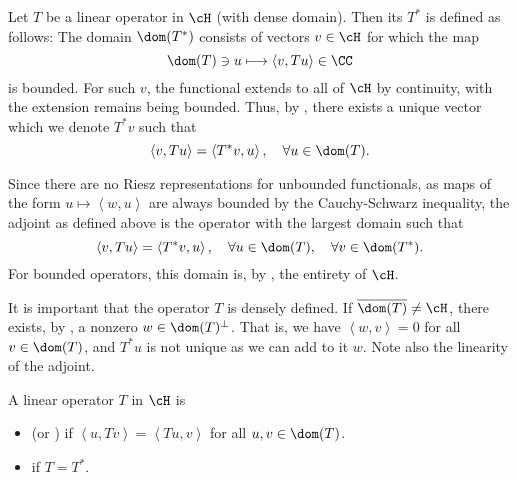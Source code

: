 \documentclass[oneside,reqno,letterpaper]{amsart}
\begin{document}
\begin{definition}
  Let \(T\) be a linear operator in \(\cH\) (with dense domain).
  Then its  \(T^*\) is defined as follows: 
  The domain \(\dom(T^*)\) consists of vectors \(v \in \cH\) for which the map 
  \[
    \dom(T) \ni u \longmapsto  \left< v, T u \right> \in \CC
  \] 
  is bounded. 
  For such \(v\), the functional extends to all of \(\cH\) by continuity, with the extension remains being bounded. 
  Thus, by , there exists a unique vector which we denote \(T^* v\) such that 
  \[
    \left< v, Tu \right> = \left< T^* v, u \right>, \quad \forall u \in \dom(T) . 
  \] 
\end{definition}

Since there are no Riesz representations for unbounded functionals, as maps of the form \(u \mapsto \left< w, u \right>\) are always bounded by the Cauchy-Schwarz inequality, the adjoint as defined above is the operator with the largest domain such that   
\[
  \left< v, T u \right> = \left< T^* v, u \right>, \quad \forall u \in \dom(T), \quad \forall v \in \dom(T^*). 
\]
For bounded operators, this domain is, by , the entirety of \(\cH\). 


It is important that the operator \(T\) is densely defined. 
If \(\overline{\dom(T)} \neq \cH\), there exists, by , a nonzero \(w \in \dom(T)^\perp\).
That is, we have \(\left< w, v \right> = 0\) for all \(v \in \dom(T)\), and \(T^* u\) is not unique as we can add to it \(w\). 
Note also the linearity of the adjoint.






\begin{definition}
  A linear operator \(T\) in \(\cH\) is 
  \begin{itemize}
    \item {} (or ) if \(\left< u, Tv \right> = \left< Tu, v \right>\) for all \(u, v \in \dom(T)\). 
  \item {} if \(T = T^*\). 
  \end{itemize}
\end{definition}
\end{document}

